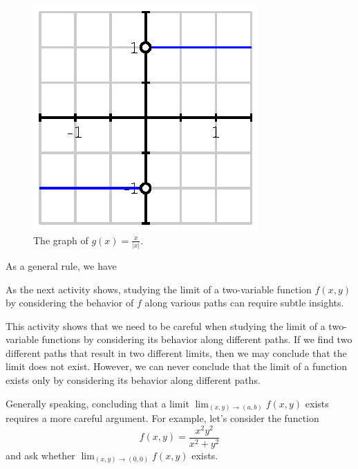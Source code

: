   \begin{figure}[ht]
    \begin{center}
      \includegraphics{figures/fig_10_1_activity_2.eps}
      \caption{The graph of $g(x) = \frac{x}{|x|}$.}
      \label{F:10.1.one.variable}
    \end{center}
  \end{figure}

As a general rule, we have 

\vspace*{5pt}
\nin 
{} \vspace*{5pt}

As the next activity shows, studying the limit of a two-variable function
$f(x,y)$ by considering the behavior of $f$ along various paths can require subtle insights. 



This activity shows that we need to be careful when studying the limit
of a two-variable functions by considering its behavior along
different paths.  If we find two
different paths that result in two different limits, then we may
conclude that the limit does not exist.  However, we can never
conclude that the limit of a function exists only by considering its
behavior along different paths.

Generally speaking, concluding that a limit
$\lim_{(x,y)\to(a,b)}f(x,y)$ exists requires a more careful
argument.  For example, let's consider the function
$$
f(x,y) = \frac{x^2y^2}{x^2+y^2}
$$
and ask whether $\lim_{(x,y)\to(0,0)}f(x,y)$ exists.

